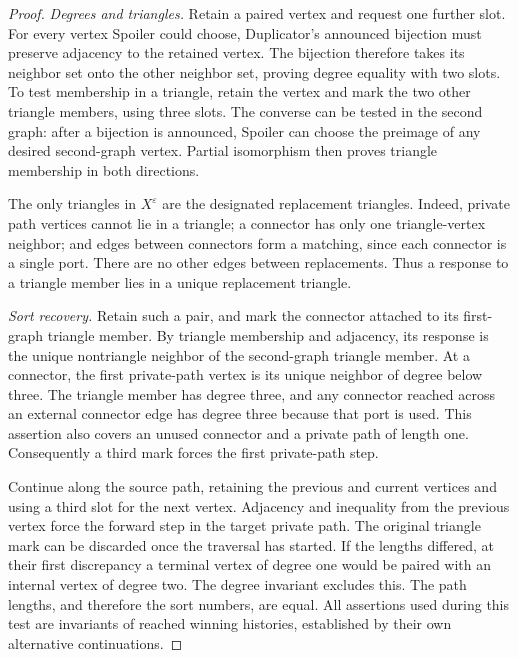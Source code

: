\documentclass[11pt]{article}
\theoremstyle{definition}
\begin{document}
\begin{proof}
\emph{Degrees and triangles.}
Retain a paired vertex and request one further slot.
For every vertex Spoiler could choose, Duplicator's announced
bijection must preserve adjacency to the retained vertex.
The bijection therefore takes its neighbor set onto the other
neighbor set, proving degree equality with two slots.
To test membership in a triangle, retain the vertex and mark the two
other triangle members, using three slots.
The converse can be tested in the second graph: after a bijection is
announced, Spoiler can choose the preimage of any desired
second-graph vertex.  Partial isomorphism then proves triangle
membership in both directions.

The only triangles in \(X^\varepsilon\) are the designated replacement
triangles.
Indeed, private path vertices cannot lie in a triangle; a connector
has only one triangle-vertex neighbor; and edges between connectors
form a matching, since each connector is a single port.
There are no other edges between replacements.
Thus a response to a triangle member lies in a unique replacement
triangle.

\emph{Sort recovery.}
Retain such a pair, and mark the connector attached to its
first-graph triangle member.
By triangle membership and adjacency, its response is the unique
nontriangle neighbor of the second-graph triangle member.
At a connector, the first private-path vertex is its unique neighbor
of degree below three.
The triangle member has degree three, and any connector reached
across an external connector edge has degree three because that port
is used.  This assertion also covers an unused connector and a
private path of length one.
Consequently a third mark forces the first private-path step.

Continue along the source path, retaining the previous and current
vertices and using a third slot for the next vertex.
Adjacency and inequality from the previous vertex force the forward
step in the target private path.
The original triangle mark can be discarded once the traversal has
started.
If the lengths differed, at their first discrepancy a terminal vertex
of degree one would be paired with an internal vertex of degree two.
The degree invariant excludes this.
The path lengths, and therefore the sort numbers, are equal.
All assertions used during this test are invariants of reached
winning histories, established by their own alternative continuations.


\end{proof}
\end{document}
